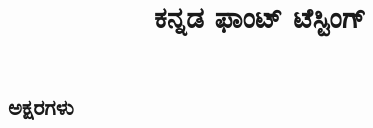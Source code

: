 \documentclass[10pt,oneside]{book}
\title{ಕನ್ನಡ ಫಾಂಟ್ ಟೆಸ್ಟಿಂಗ್}
\date{}
\author{}
\begin{document}
\maketitle{}
\begin{spacing}{1.6}
  \chapter*{ಅಕ್ಷರಗಳು}
  \LARGE

\end{spacing}
\end{document}
